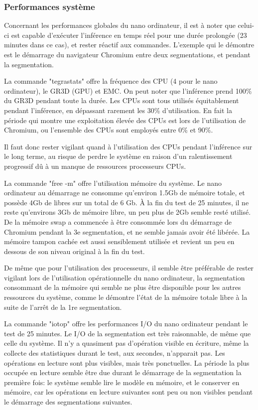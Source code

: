 \subsubsection{Performances système}
\par Concernant les performances globales du nano ordinateur, il est à noter que celui-ci est capable d'exécuter l'inférence en temps réel pour une durée prolongée (23 minutes dans ce cas), et rester réactif aux commandes. L'exemple qui le démontre est le démarrage du navigateur Chromium entre deux segmentations, et pendant la segmentation.
\par La commande "tegrastats" offre la fréquence des CPU (4 pour le nano ordinateur), le GR3D (GPU) et EMC. On peut noter que l'inférence prend 100\% du GR3D pendant toute la durée. Les CPUs sont tous utilisés équitablement pendant l'inférence, en dépassant rarement les 30\% d'utilisation. En fait la période qui montre une exploitation élevée des CPUs est lors de l'utilisation de Chromium, ou l'ensemble des CPUs sont employés entre 0\% et 90\%. 
\par Il faut donc rester vigilant quand à l'utilisation des CPUs pendant l'inférence sur le long terme, au risque de perdre le système en raison d'un ralentissement progressif dû à un manque de ressources processeurs CPUs.
\par La commande "free -m" offre l'utilisation mémoire du système. Le nano ordinateur au démarrage ne consomme qu'environ 1.5Gb de mémoire totale, et possède 4Gb de libres sur un total de 6 Gb. À la fin du test de 25 minutes, il ne reste qu'environs 3Gb de mémoire libre, un peu plus de 2Gb semble resté utilisé. De la mémoire swap a commencée à être consommée lors du démarrage de Chromium pendant la 3e segmentation, et ne semble jamais avoir été libérée. La mémoire tampon cachée est aussi sensiblement utilisée et revient un peu en dessous de son niveau original à la fin du test. 
\par De même que pour l'utilisation des processeurs, il semble être préférable de rester vigilant lors de l'utilisation opérationnelle du nano ordinateur, la segmentation consommant de la mémoire qui semble ne plus être disponible pour les autres ressources du système, comme le démontre l'état de la mémoire totale libre à la suite de l'arrêt de la 1re segmentation. 
\par La commande "iotop" offre les performances I/O du nano ordinateur pendant le test de 25 minutes. Le I/O de la segmentation est très raisonnable, de même que celle du système. Il n'y a quasiment pas d'opération visible en écriture, même la collecte des statistiques durant le test, aux secondes, n'apparait pas. Les opérations en lecture sont plus visibles, mais très ponctuelles. La période la plus occupée en lecture semble être due durant le démarrage de la segmentation la première fois: le système semble lire le modèle en mémoire, et le conserver en mémoire, car les opérations en lecture suivantes sont peu ou non visibles pendant le démarrage des segmentations suivantes.
